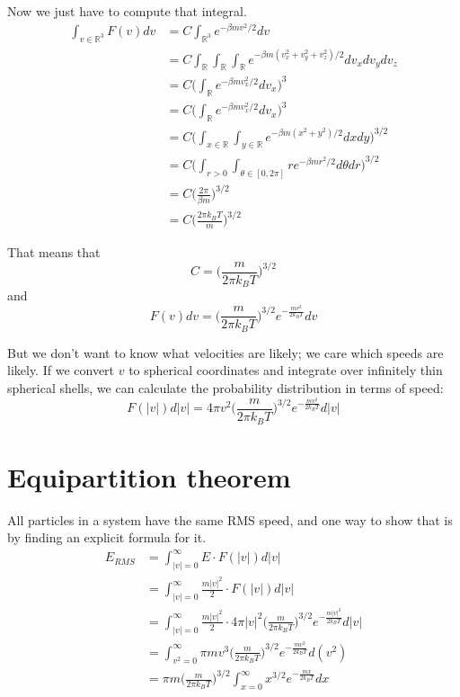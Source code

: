 \documentclass[12pt]{article}
\begin{document}
Now we just have to compute that integral.
\begin{align*}
    \int_{v \in \mathbb{R}^3} F(v) dv &= C \int_{\mathbb{R}^3} e^{- \beta m v^2 / 2} dv \\
    &= C \int_{\mathbb{R}} \int_{\mathbb{R}} \int_{\mathbb{R}} e^{- \beta m (v_x^2 + v_y^2 + v_z^2) / 2} dv_x dv_y dv_z \\
    &= C \Bigg( \int_{\mathbb{R}} e^{- \beta m v_x^2 / 2} dv_x \Bigg)^3 \\
    &= C \Bigg( \int_{\mathbb{R}} e^{- \beta m v_x^2 / 2} dv_x \Bigg)^3 \\
    &= C \Bigg( \int_{x \in \mathbb{R}} \int_{y \in \mathbb{R}} e^{- \beta m (x^2 + y^2) / 2} dx dy \Bigg)^{3/2} \\
    &= C \Bigg( \int_{r>0} \int_{\theta \in [0, 2\pi]} r e^{- \beta m r^2 / 2} d\theta dr \Bigg)^{3/2} \\
    &= C \Big( \frac{2 \pi}{\beta m} \Big)^{3/2} \\
    &= C \Big( \frac{2 \pi k_B T}{m} \Big)^{3/2}
\end{align*}

That means that
\[C = \Big( \frac{m}{2 \pi k_B T} \Big)^{3/2}\]
and
\[F(v) dv = \Big( \frac{m}{2 \pi k_B T} \Big)^{3/2} e^{-\frac{m v^2}{2 k_B T}} dv\]

But we don't want to know what velocities are likely; we care which speeds are likely. If we convert $v$ to spherical coordinates and integrate over infinitely thin spherical shells, we can calculate the probability distribution in terms of speed:
\[F(|v|) d|v| = 4 \pi v^2 \Big( \frac{m}{2 \pi k_B T} \Big)^{3/2} e^{-\frac{m v^2}{2 k_B T}} d|v|\]

\section{Equipartition theorem}
All particles in a system have the same RMS speed, and one way to show that is by finding an explicit formula for it.
\begin{align*}
    E_{RMS} &= \int_{|v|=0}^\infty E \cdot F(|v|) d|v| \\
    &= \int_{|v|=0}^\infty \frac{m |v|^2}{2}  \cdot F(|v|) d|v| \\
    &= \int_{|v|=0}^\infty \frac{m |v|^2}{2} \cdot 4 \pi |v|^2 \Big( \frac{m}{2 \pi k_B T} \Big)^{3/2} e^{-\frac{m |v|^2}{2 k_B T}} d|v| \\
    &= \int_{v^2=0}^\infty \pi m v^3 \Big( \frac{m}{2 \pi k_B T} \Big)^{3/2} e^{-\frac{m v^2}{2 k_B T}} d(v^2) \\
    &= \pi m \Big( \frac{m}{2 \pi k_B T} \Big)^{3/2} \int_{x=0}^\infty x^{3/2} e^{-\frac{m x}{2 k_B T}} dx \\
\end{align*}
\end{document}

